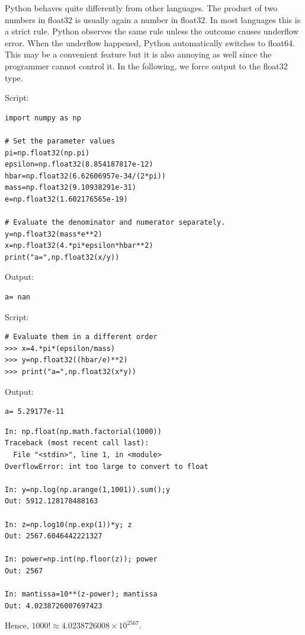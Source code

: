 \begin{example}

	Python behaves quite differently from other languages.  The product of two numbers in float32 is usually again a number in float32.  In most languages this is a strict rule.  Python observes the same rule unless the outcome causes underflow error.  When the underflow happened, Python automatically switches to float64.  This may be a convenient feature but it is also annoying as well since the programmer cannot control it.  In the following, we force output to the float32 type. 

\small
\begin{mybox}
Script:
\begin{verbatim}
import numpy as np

# Set the parameter values
pi=np.float32(np.pi)
epsilon=np.float32(8.854187817e-12)
hbar=np.float32(6.62606957e-34/(2*pi))
mass=np.float32(9.10938291e-31)
e=np.float32(1.602176565e-19)

# Evaluate the denominator and numerator separately. 
y=np.float32(mass*e**2) 
x=np.float32(4.*pi*epsilon*hbar**2) 
print("a=",np.float32(x/y))
\end{verbatim}

\medskip
Output:
\begin{verbatim}
a= nan
\end{verbatim}

\bigskip
Script:
\begin{verbatim}
# Evaluate them in a different order
>>> x=4.*pi*(epsilon/mass)
>>> y=np.float32((hbar/e)**2)
>>> print("a=",np.float32(x*y)) 
\end{verbatim}

\medskip
Output:
\begin{verbatim}
a= 5.29177e-11 
\end{verbatim}
\end{mybox}
\normalsize
\end{example}

\newpage
\noindent
\begin{example}

\small
\begin{mybox}
	\begin{verbatim}
In: np.float(np.math.factorial(1000))
Traceback (most recent call last):
  File "<stdin>", line 1, in <module>
OverflowError: int too large to convert to float

In: y=np.log(np.arange(1,1001)).sum();y
Out: 5912.128178488163

In: z=np.log10(np.exp(1))*y; z
Out: 2567.6046442221327
   
In: power=np.int(np.floor(z)); power
Out: 2567
    
In: mantissa=10**(z-power); mantissa
Out: 4.0238726007697423
   \end{verbatim}
\end{mybox}
\normalsize

\medskip\noindent
Hence, $1000! \approx 4.0238726008 \times 10^{2567}$.  
\end{example}

